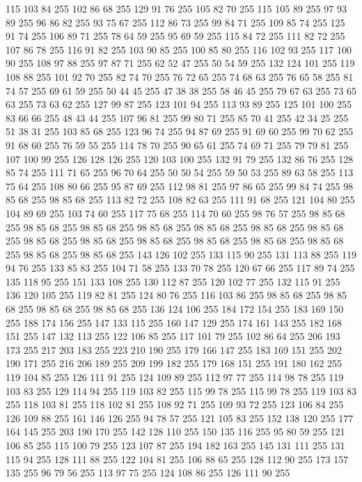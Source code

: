 115 103 84 255 102 86 68 255 129 91 76 255 105 82 70 255 115 105 89 255 97 93 89 255 96 86 82 255 93 75 67 255 112 86 73 255 99 84 71 255 109 85 74 255 125 91 74 255 106 89 71 255 78 64 59 255 95 69 59 255 115 84 72 255 111 82 72 255 107 86 78 255 116 91 82 255 103 90 85 255 100 85 80 255 116 102 93 255 117 100 90 255 108 97 88 255 97 87 71 255 62 52 47 255 50 54 59 255 132 124 101 255 119 108 88 255 101 92 70 255 82 74 70 255 76 72 65 255 74 68 63 255 76 65 58 255 81 74 57 255 69 61 59 255 50 44 45 255 47 38 38 255 58 46 45 255 79 67 63 255 73 65 63 255 73 63 62 255 127 99 87 255 123 101 94 255 113 93 89 255 125 101 100 255 83 66 66 255 48 43 44 255 107 96 81 255 99 80 71 255 85 70 41 255 42 34 25 255 51 38 31 255 103 85 68 255 123 96 74 255 94 87 69 255 91 69 60 255 99 70 62 255 91 68 60 255 76 59 55 255 114 78 70 255 90 65 61 255 74 69 71 255 79 79 81 255
107 100 99 255 126 128 126 255 120 103 100 255 132 91 79 255 132 86 76 255 128 85 74 255 111 71 65 255 96 70 64 255 50 50 54 255 59 50 53 255 89 63 58 255 113 75 64 255 108 80 66 255 95 87 69 255 112 98 81 255 97 86 65 255 99 84 74 255 98 85 68 255 98 85 68 255 113 82 72 255 108 82 63 255 111 91 68 255 121 104 80 255 104 89 69 255 103 74 60 255 117 75 68 255 114 70 60 255 98 76 57 255 98 85 68 255 98 85 68 255 98 85 68 255 98 85 68 255 98 85 68 255 98 85 68 255 98 85 68 255 98 85 68 255 98 85 68 255 98 85 68 255 98 85 68 255 98 85 68 255 98 85 68 255 98 85 68 255 98 85 68 255 143 126 102 255 133 115 90 255 131 113 88 255 119 94 76 255 133 85 83 255 104 71 58 255 133 70 78 255 120 67 66 255 117 89 74 255 135 118 95 255 151 133 108 255 130 112 87 255 120 102 77 255 132 115 91 255 136 120 105 255 119 82 81 255 124 80 76 255 116 103 86 255 98 85 68 255 98 85 68 255 98 85 68 255
98 85 68 255 136 124 106 255 184 172 154 255 183 169 150 255 188 174 156 255 147 133 115 255 160 147 129 255 174 161 143 255 182 168 151 255 147 132 113 255 122 106 85 255 117 101 79 255 102 86 64 255 206 193 173 255 217 203 183 255 223 210 190 255 179 166 147 255 183 169 151 255 202 190 171 255 216 206 189 255 209 199 182 255 179 168 151 255 191 180 162 255 119 104 85 255 126 111 91 255 124 109 89 255 112 97 77 255 114 98 78 255 119 103 83 255 129 114 94 255 119 103 82 255 115 99 78 255 115 99 78 255 119 103 83 255 118 103 81 255 118 102 81 255 108 92 71 255 109 93 72 255 123 106 84 255 126 109 88 255 161 146 126 255 94 78 57 255 121 105 83 255 152 138 120 255 177 164 145 255 203 190 170 255 142 128 110 255 150 135 116 255 95 80 59 255 121 106 85 255 115 100 79 255 123 107 87 255 194 182 163 255 145 131 111 255 131 115 94 255 128 111 88 255 122 104 81 255 106 88 65 255 128 112 90 255 173 157 135 255 96 79 56 255 113 97 75 255 124 108 86 255 126 111 90 255
